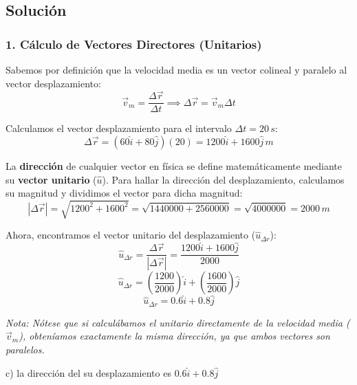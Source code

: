 \documentclass[12pt, a4paper]{article}
\begin{document}
\subsection*{Solución}

\subsubsection*{1. Cálculo de Vectores Directores (Unitarios)}
Sabemos por definición que la velocidad media es un vector colineal y paralelo al vector desplazamiento:
$$ \vec{v}_m = \frac{\Delta \vec{r}}{\Delta t} \implies \Delta \vec{r} = \vec{v}_m \Delta t $$

Calculamos el vector desplazamiento para el intervalo $\Delta t = 20\,\si{s}$:
$$ \Delta \vec{r} = (60\hat{i} + 80\hat{j})(20) = 1200\hat{i} + 1600\hat{j} \,\si{m} $$

La \textbf{dirección} de cualquier vector en física se define matemáticamente mediante su \textbf{vector unitario} ($\hat{u}$). Para hallar la dirección del desplazamiento, calculamos su magnitud y dividimos el vector para dicha magnitud:
$$ |\Delta \vec{r}| = \sqrt{1200^2 + 1600^2} = \sqrt{1440000 + 2560000} = \sqrt{4000000} = 2000\,\si{m} $$

Ahora, encontramos el vector unitario del desplazamiento ($\hat{u}_{\Delta r}$):
$$ \hat{u}_{\Delta r} = \frac{\Delta \vec{r}}{|\Delta \vec{r}|} = \frac{1200\hat{i} + 1600\hat{j}}{2000} $$
$$ \hat{u}_{\Delta r} = \left(\frac{1200}{2000}\right)\hat{i} + \left(\frac{1600}{2000}\right)\hat{j} $$
$$ \hat{u}_{\Delta r} = 0.6\hat{i} + 0.8\hat{j} $$

\textit{Nota: Nótese que si calculábamos el unitario directamente de la velocidad media ($\vec{v}_m$), obteníamos exactamente la misma dirección, ya que ambos vectores son paralelos.}

\begin{tcolorbox}[colback=green!5!white, colframe=green!50!black, title=Respuesta Final]
\centering \Large c) la dirección del su desplazamiento es $0.6\hat{i} + 0.8\hat{j}$
\end{tcolorbox}

\newpage
\end{document}
